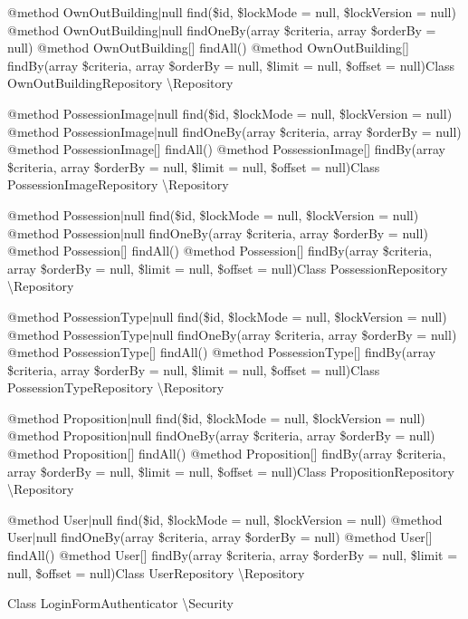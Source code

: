 @method Own\+Out\+Building$\vert$null find(\$id, \$lock\+Mode = null, \$lock\+Version = null) @method Own\+Out\+Building$\vert$null find\+One\+By(array \$criteria, array \$order\+By = null) @method Own\+Out\+Building\mbox{[}\mbox{]} find\+All() @method Own\+Out\+Building\mbox{[}\mbox{]} find\+By(array \$criteria, array \$order\+By = null, \$limit = null, \$offset = null)Class Own\+Out\+Building\+Repository \textbackslash{}\+Repository

@method Possession\+Image$\vert$null find(\$id, \$lock\+Mode = null, \$lock\+Version = null) @method Possession\+Image$\vert$null find\+One\+By(array \$criteria, array \$order\+By = null) @method Possession\+Image\mbox{[}\mbox{]} find\+All() @method Possession\+Image\mbox{[}\mbox{]} find\+By(array \$criteria, array \$order\+By = null, \$limit = null, \$offset = null)Class Possession\+Image\+Repository \textbackslash{}\+Repository

@method Possession$\vert$null find(\$id, \$lock\+Mode = null, \$lock\+Version = null) @method Possession$\vert$null find\+One\+By(array \$criteria, array \$order\+By = null) @method Possession\mbox{[}\mbox{]} find\+All() @method Possession\mbox{[}\mbox{]} find\+By(array \$criteria, array \$order\+By = null, \$limit = null, \$offset = null)Class Possession\+Repository \textbackslash{}\+Repository

@method Possession\+Type$\vert$null find(\$id, \$lock\+Mode = null, \$lock\+Version = null) @method Possession\+Type$\vert$null find\+One\+By(array \$criteria, array \$order\+By = null) @method Possession\+Type\mbox{[}\mbox{]} find\+All() @method Possession\+Type\mbox{[}\mbox{]} find\+By(array \$criteria, array \$order\+By = null, \$limit = null, \$offset = null)Class Possession\+Type\+Repository \textbackslash{}\+Repository

@method Proposition$\vert$null find(\$id, \$lock\+Mode = null, \$lock\+Version = null) @method Proposition$\vert$null find\+One\+By(array \$criteria, array \$order\+By = null) @method Proposition\mbox{[}\mbox{]} find\+All() @method Proposition\mbox{[}\mbox{]} find\+By(array \$criteria, array \$order\+By = null, \$limit = null, \$offset = null)Class Proposition\+Repository \textbackslash{}\+Repository

@method User$\vert$null find(\$id, \$lock\+Mode = null, \$lock\+Version = null) @method User$\vert$null find\+One\+By(array \$criteria, array \$order\+By = null) @method User\mbox{[}\mbox{]} find\+All() @method User\mbox{[}\mbox{]} find\+By(array \$criteria, array \$order\+By = null, \$limit = null, \$offset = null)Class User\+Repository \textbackslash{}\+Repository

Class Login\+Form\+Authenticator \textbackslash{}\+Security 